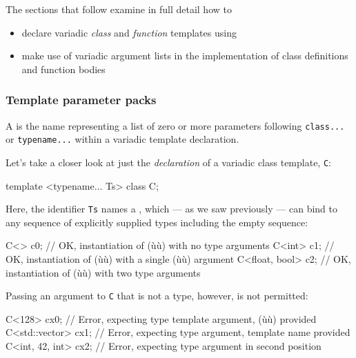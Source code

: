 \noindent The sections that follow examine in full detail how to
\begin{itemize}
\item{declare variadic \emph{class} and \emph{function} templates using }
\item{make use of variadic argument lists in the implementation of class definitions and function bodies}
\end{itemize}

\subsubsection[Template parameter packs]{Template parameter packs}\label{template-parameter-packs}

A  is the name representing a list of
zero or more parameters following \lstinline!class...! or
\lstinline!typename...! within a variadic template declaration.

Let's take a closer look at just the \emph{declaration} of a variadic
class template, \lstinline!C!:

\begin{emcppslisting}
template <typename... Ts> class C;
\end{emcppslisting}
    

\noindent Here, the identifier \lstinline!Ts! names a , which --- as we saw previously --- can bind to any sequence of
explicitly supplied types including the empty sequence:

\begin{emcppslisting}
C<> c0;             // OK, instantiation of (ù{}ù) with no type arguments
C<int> c1;          // OK, instantiation of (ù{}ù) with a single (ù{}ù) argument
C<float, bool> c2;  // OK, instantiation of (ù{}ù) with two type arguments
\end{emcppslisting}
    

\noindent Passing an argument to \lstinline!C! that is not a type, however, is not
permitted:

\begin{emcppslisting}
C<128> cx0;           // Error, expecting type template argument, (ù{}ù) provided
C<std::vector> cx1;   // Error, expecting type argument, template name provided
C<int, 42, int> cx2;  // Error, expecting type argument in second position
\end{emcppslisting}
    

